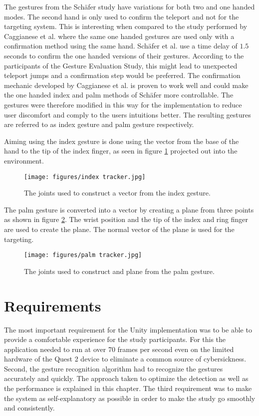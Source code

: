 The gestures from the Schäfer study have variations for both two and one handed modes. The second hand is only used to confirm the teleport and not for the targeting system. 
This is interesting when compared to the study performed by Caggianese et al. \cite{Caggianese} where the same one handed gestures are used only with a confirmation method using the same hand. Schäfer et al. use a time delay of $1.5$ seconds to confirm the one handed versions of their gestures. According to the participants of the Gesture Evaluation Study, this might lead to unexpected teleport jumps and a confirmation step would be preferred. The confirmation mechanic developed by Caggianese et al. is proven to work well and could make the one handed index and palm methods of Schäfer more controllable. The gestures were therefore modified in this way for the implementation to reduce user discomfort and comply to the users intuitions better. The resulting gestures are referred to as index gesture and palm gesture respectively. 

Aiming using the index gesture is done using the vector from the base of the hand to the tip of the index finger, as seen in figure \ref{fig:indexTracker} projected out into the environment. 

\begin{figure}[!ht]
    \centering
    \texttt{[image: figures/index tracker.jpg]}
    \caption{The joints used to construct a vector from the index gesture.}
    \label{fig:indexTracker}
\end{figure}

The palm gesture is converted into a vector by creating a plane from three points as shown in figure \ref{fig:palmTracker}. The wrist position and the tip of the index and ring finger are used to create the plane. The normal vector of the plane is used for the targeting.
\begin{figure}[!ht]
    \centering
    \texttt{[image: figures/palm tracker.jpg]}
    \caption{The joints used to construct and plane from the palm gesture.}
    \label{fig:palmTracker}
\end{figure}

\section{Requirements}
The most important requirement for the Unity implementation was to be able to provide a comfortable experience for the study participants. For this the application needed to run at over 70 frames per second even on the limited hardware of the Quest 2 device to eliminate a common source of cybersickness. Second, the gesture recognition algorithm had to recognize the gestures accurately and quickly. The approach taken to optimize the detection as well as the performance is explained in this chapter. The third requirement was to make the system as self-explanatory as possible in order to make the study go smoothly and consistently. 

